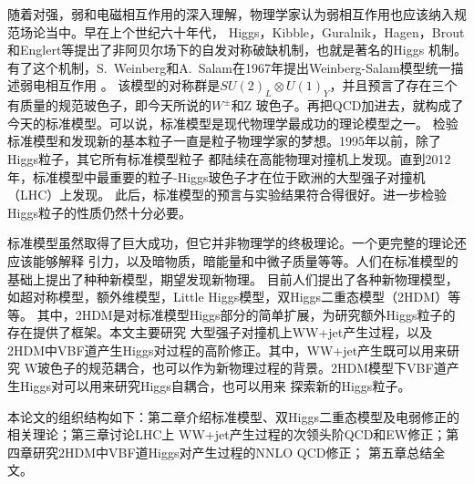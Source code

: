随着对强，弱和电磁相互作用的深入理解，物理学家认为弱相互作用也应该纳入规范场论当中。早在上个世纪六十年代，
Higgs，Kibble，Guralnik，Hagen，Brout和Englert等提出了非阿贝尔场下的自发对称破缺机制，也就是著名的Higgs
机制\cite{Higgs:1,Higgs:2,Higgs:3}。
有了这个机制，S.~Weinberg和A.~Salam在1967年提出Weinberg-Salam模型统一描述弱电相互作用
\cite{GWS:1,GWS:2,GWS:3}。
该模型的对称群是$SU(2)_L\otimes U(1)_Y$，并且预言了存在三个有质量的规范玻色子，即今天所说的$W^\pm$和Z
玻色子。再把QCD加进去，就构成了今天的标准模型。可以说，标准模型是现代物理学最成功的理论模型之一。
检验标准模型和发现新的基本粒子一直是粒子物理学家的梦想。1995年以前，除了Higgs粒子，其它所有标准模型粒子
都陆续在高能物理对撞机上发现。直到2012年，标准模型中最重要的粒子-Higgs玻色子才在位于欧洲的大型强子对撞机
（LHC）上发现\cite{ATLAS-2012,CMS-2012}。
此后，标准模型的预言与实验结果符合得很好。进一步检验Higgs粒子的性质仍然十分必要。

标准模型虽然取得了巨大成功，但它并非物理学的终极理论。一个更完整的理论还应该能够解释
引力，以及暗物质，暗能量和中微子质量等等。人们在标准模型的基础上提出了种种新模型，期望发现新物理。
目前人们提出了各种新物理模型，如超对称模型，额外维模型，Little Higgs模型，双Higgs二重态模型（2HDM）等等。
其中，2HDM是对标准模型Higgs部分的简单扩展，为研究额外Higgs粒子的存在提供了框架。本文主要研究
大型强子对撞机上WW+jet产生过程，以及2HDM中VBF道产生Higgs对过程的高阶修正。其中，WW+jet产生既可以用来研究
W玻色子的规范耦合，也可以作为新物理过程的背景。2HDM模型下VBF道产生Higgs对可以用来研究Higgs自耦合，也可以用来
探索新的Higgs粒子。

本论文的组织结构如下：第二章介绍标准模型、双Higgs二重态模型及电弱修正的相关理论；第三章讨论LHC上
WW+jet产生过程的次领头阶QCD和EW修正；第四章研究2HDM中VBF道Higgs对产生过程的NNLO QCD修正；
第五章总结全文。
